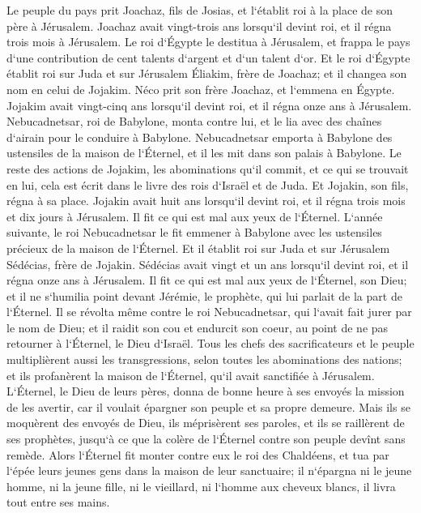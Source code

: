 \verse Le peuple du pays prit Joachaz, fils de Josias, et l`établit roi à la place de son père à Jérusalem. 
\verse Joachaz avait vingt-trois ans lorsqu`il devint roi, et il régna trois mois à Jérusalem. 
\verse Le roi d`Égypte le destitua à Jérusalem, et frappa le pays d`une contribution de cent talents d`argent et d`un talent d`or. 
\verse Et le roi d`Égypte établit roi sur Juda et sur Jérusalem Éliakim, frère de Joachaz; et il changea son nom en celui de Jojakim. Néco prit son frère Joachaz, et l`emmena en Égypte. 
\verse Jojakim avait vingt-cinq ans lorsqu`il devint roi, et il régna onze ans à Jérusalem. 
\verse Nebucadnetsar, roi de Babylone, monta contre lui, et le lia avec des chaînes d`airain pour le conduire à Babylone. 
\verse Nebucadnetsar emporta à Babylone des ustensiles de la maison de l`Éternel, et il les mit dans son palais à Babylone. 
\verse Le reste des actions de Jojakim, les abominations qu`il commit, et ce qui se trouvait en lui, cela est écrit dans le livre des rois d`Israël et de Juda. Et Jojakin, son fils, régna à sa place. 
\verse Jojakin avait huit ans lorsqu`il devint roi, et il régna trois mois et dix jours à Jérusalem. Il fit ce qui est mal aux yeux de l`Éternel. 
\verse L`année suivante, le roi Nebucadnetsar le fit emmener à Babylone avec les ustensiles précieux de la maison de l`Éternel. Et il établit roi sur Juda et sur Jérusalem Sédécias, frère de Jojakin. 
\verse Sédécias avait vingt et un ans lorsqu`il devint roi, et il régna onze ans à Jérusalem. 
\verse Il fit ce qui est mal aux yeux de l`Éternel, son Dieu; et il ne s`humilia point devant Jérémie, le prophète, qui lui parlait de la part de l`Éternel. 
\verse Il se révolta même contre le roi Nebucadnetsar, qui l`avait fait jurer par le nom de Dieu; et il raidit son cou et endurcit son coeur, au point de ne pas retourner à l`Éternel, le Dieu d`Israël. 
\verse Tous les chefs des sacrificateurs et le peuple multiplièrent aussi les transgressions, selon toutes les abominations des nations; et ils profanèrent la maison de l`Éternel, qu`il avait sanctifiée à Jérusalem. 
\verse L`Éternel, le Dieu de leurs pères, donna de bonne heure à ses envoyés la mission de les avertir, car il voulait épargner son peuple et sa propre demeure. 
\verse Mais ils se moquèrent des envoyés de Dieu, ils méprisèrent ses paroles, et ils se raillèrent de ses prophètes, jusqu`à ce que la colère de l`Éternel contre son peuple devînt sans remède. 
\verse Alors l`Éternel fit monter contre eux le roi des Chaldéens, et tua par l`épée leurs jeunes gens dans la maison de leur sanctuaire; il n`épargna ni le jeune homme, ni la jeune fille, ni le vieillard, ni l`homme aux cheveux blancs, il livra tout entre ses mains. 
